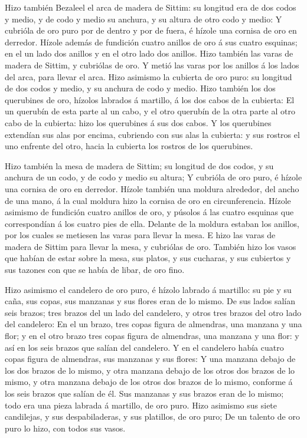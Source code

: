  Hizo también Bezaleel el arca de madera de Sittim: su
longitud era de dos codos y medio, y de codo y medio su anchura, y su
altura de otro codo y medio:  Y cubrióla de oro puro por de
dentro y por de fuera, é hízole una cornisa de oro en derredor.
 Hízole además de fundición cuatro anillos de oro á sus
cuatro esquinas; en el un lado dos anillos y en el otro lado dos
anillos.  Hizo también las varas de madera de Sittim, y
cubriólas de oro.  Y metió las varas por los anillos á los
lados del arca, para llevar el arca.  Hizo asimismo la
cubierta de oro puro: su longitud de dos codos y medio, y su anchura de
codo y medio.  Hizo también los dos querubines de oro,
hízolos labrados á martillo, á los dos cabos de la cubierta:
 El un querubín de esta parte al un cabo, y el otro querubín
de la otra parte al otro cabo de la cubierta: hizo los querubines á sus
dos cabos.  Y los querubines extendían sus alas por encima,
cubriendo con sus alas la cubierta: y sus rostros el uno enfrente del
otro, hacia la cubierta los rostros de los querubines.

 Hizo también la mesa de madera de Sittim; su longitud de
dos codos, y su anchura de un codo, y de codo y medio su altura;
 Y cubrióla de oro puro, é hízole una cornisa de oro en
derredor.  Hízole también una moldura alrededor, del ancho
de una mano, á la cual moldura hizo la cornisa de oro en circunferencia.
 Hízole asimismo de fundición cuatro anillos de oro, y
púsolos á las cuatro esquinas que correspondían á los cuatro pies de
ella.  Delante de la moldura estaban los anillos, por los
cuales se metiesen las varas para llevar la mesa.  E hizo
las varas de madera de Sittim para llevar la mesa, y cubriólas de oro.
 También hizo los vasos que habían de estar sobre la mesa,
sus platos, y sus cucharas, y sus cubiertos y sus tazones con que se
había de libar, de oro fino.

 Hizo asimismo el candelero de oro puro, é hízolo labrado á
martillo: su pie y su caña, sus copas, sus manzanas y sus flores eran de
lo mismo.  De sus lados salían seis brazos; tres brazos del
un lado del candelero, y otros tres brazos del otro lado del candelero:
 En el un brazo, tres copas figura de almendras, una
manzana y una flor; y en el otro brazo tres copas figura de almendras,
una manzana y una flor: y así en los seis brazos que salían del
candelero.  Y en el candelero había cuatro copas figura de
almendras, sus manzanas y sus flores:  Y una manzana debajo
de los dos brazos de lo mismo, y otra manzana debajo de los otros dos
brazos de lo mismo, y otra manzana debajo de los otros dos brazos de lo
mismo, conforme á los seis brazos que salían de él.  Sus
manzanas y sus brazos eran de lo mismo; todo era una pieza labrada á
martillo, de oro puro.  Hizo asimismo sus siete candilejas,
y sus despabiladeras, y sus platillos, de oro puro;  De un
talento de oro puro lo hizo, con todos sus vasos.

